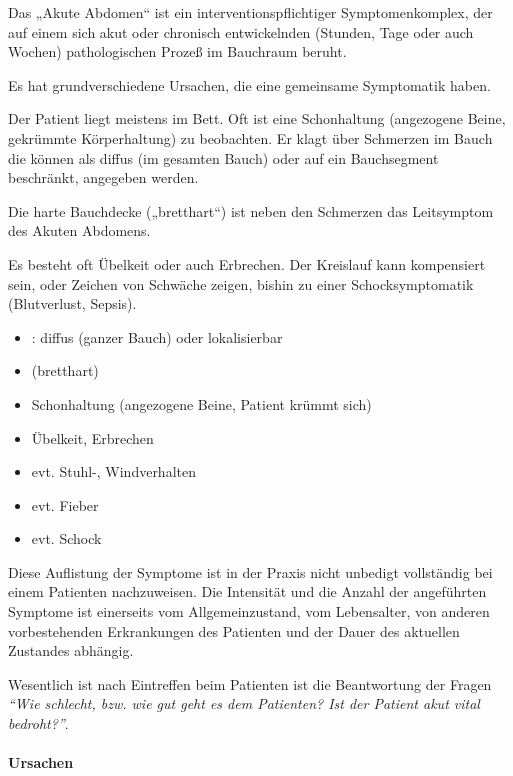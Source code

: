 \gMarried
{Das „Akute Abdomen“ ist ein interventionspflichtiger
Symptomenkomplex, der auf einem sich akut oder chronisch
entwickelnden (Stunden, Tage oder auch Wochen) pathologischen
Prozeß im Bauchraum beruht.

Es hat grundverschiedene Ursachen, die eine gemeinsame
Symptomatik haben.

Der Patient liegt meistens im Bett. Oft ist
eine Schonhaltung (angezogene Beine, gekrümmte
Körperhaltung) zu beobachten. Er klagt über Schmerzen im
Bauch die können als diffus (im gesamten Bauch) oder auf ein Bauchsegment
beschränkt, angegeben werden. 

Die harte Bauchdecke („bretthart“) ist neben den Schmerzen
das Leitsymptom des Akuten Abdomens. 

Es besteht oft Übelkeit oder auch Erbrechen. Der Kreislauf
kann kompensiert sein, oder Zeichen von Schwäche zeigen,
bishin zu einer Schocksymptomatik (Blutverlust, Sepsis).} 
{

\begin{itemize}
    \item {}: diffus (ganzer Bauch) oder
    lokalisierbar
    \item {} (bretthart)
    \item Schonhaltung  (angezogene Beine, Patient
    kr\"ummt sich)
    \item \"Ubelkeit, Erbrechen
    \item evt. Stuhl-, Windverhalten
    \item evt. Fieber
    \item evt. Schock
\end{itemize}
}


Diese Auflistung der Symptome ist in der Praxis nicht
unbedigt vollständig bei einem Patienten nachzuweisen. Die
Intensität und die Anzahl der angeführten Symptome ist
einerseits vom Allgemeinzustand, vom Lebensalter, von
anderen vorbestehenden Erkrankungen des Patienten und der
Dauer des aktuellen Zustandes abhängig.

Wesentlich ist nach Eintreffen beim Patienten ist die
Beantwortung der Fragen \emph{"`Wie schlecht, bzw. wie gut
geht es dem Patienten? Ist der Patient akut vital
bedroht?"'}.



\paragraph*{Ursachen}

